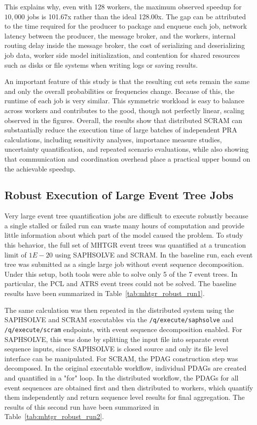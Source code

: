 This explains why, even with 128 workers, the maximum observed speedup for $10{,}000$ jobs is 101.67x rather than the ideal 128.00x. The gap can be attributed to the time required for the producer to package and enqueue each job, network latency between the producer, the message broker, and the workers, internal routing delay inside the message broker, the cost of serializing and deserializing job data, worker side model initialization, and contention for shared resources such as disks or file systems when writing logs or saving results.

An important feature of this study is that the resulting cut sets remain the same and only the overall probabilities or frequencies change. Because of this, the runtime of each job is very similar. This symmetric workload is easy to balance across workers and contributes to the good, though not perfectly linear, scaling observed in the figures. Overall, the results show that distributed SCRAM can substantially reduce the execution time of large batches of independent PRA calculations, including sensitivity analyses, importance measure studies, uncertainty quantification, and repeated scenario evaluations, while also showing that communication and coordination overhead place a practical upper bound on the achievable speedup.

\subsection{Robust Execution of Large Event Tree Jobs}
Very large event tree quantification jobs are difficult to execute robustly because a single stalled or failed run can waste many hours of computation and provide little information about which part of the model caused the problem. To study this behavior, the full set of MHTGR event trees was quantified at a truncation limit of $1E-20$ using SAPHSOLVE and SCRAM. In the baseline run, each event tree was submitted as a single large job without event sequence decomposition. Under this setup, both tools were able to solve only 5 of the 7 event trees. In particular, the PCL and ATRS event trees could not be solved. The baseline results have been summarized in Table~\ref{tab:mhtgr_robust_run1}.



The same calculation was then repeated in the distributed system using the SAPHSOLVE and SCRAM executables via the \texttt{/q/execute/saphsolve} and \texttt{/q/execute/scram} endpoints, with event sequence decomposition enabled. For SAPHSOLVE, this was done by splitting the input file into separate event sequence inputs, since SAPHSOLVE is closed source and only its file level interface can be manipulated. For SCRAM, the PDAG construction step was decomposed. In the original executable workflow, individual PDAGs are created and quantified in a "for" loop. In the distributed workflow, the PDAGs for all event sequences are obtained first and then distributed to workers, which quantify them independently and return sequence level results for final aggregation. The results of this second run have been summarized in Table~\ref{tab:mhtgr_robust_run2}.

